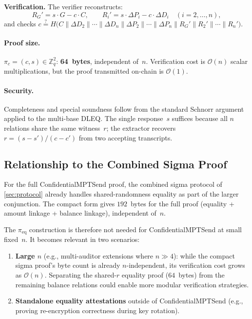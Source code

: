 \documentclass[11pt]{article}
\theoremstyle{definition}
\newcommand{\Zq}{\mathbb{Z}_q}
\begin{document}
\noindent\textbf{Verification.}
The verifier reconstructs:
\[
  R_G' = s \cdot G - c \cdot C, \qquad
  R_i' = s \cdot \Delta P_i - c \cdot \Delta D_i
  \quad (i = 2, \ldots, n),
\]
and checks $c \stackrel{?}{=}
H\bigl(C
\| \Delta D_2 \| \cdots \| \Delta D_n
\| \Delta P_2 \| \cdots \| \Delta P_n
\| R_G' \| R_2' \| \cdots \| R_n'\bigr)$.

\paragraph{Proof size.}
$\pi_c = (c, s) \in \Zq^2$: \textbf{64~bytes}, independent of~$n$.
Verification cost is $\mathcal{O}(n)$ scalar multiplications, but the
proof transmitted on-chain is $\mathcal{O}(1)$.

\paragraph{Security.}
Completeness and special soundness follow from the standard Schnorr
argument applied to the multi-base DLEQ.
The single response~$s$ suffices because all $n$ relations share the
same witness~$r$; the extractor recovers
$r = (s - s') / (c - c')$ from two accepting transcripts.

\subsection{Relationship to the Combined Sigma Proof}

For the full \textsf{ConfidentialMPTSend} proof, the combined sigma
protocol of \cref{sec:protocol} already handles shared-randomness
equality as part of the larger conjunction.
The compact form gives $192$~bytes for the full proof (equality +
amount linkage + balance linkage), independent of~$n$.

The $\pi_{\mathrm{eq}}$ construction is therefore not needed for
\textsf{ConfidentialMPTSend} at small fixed~$n$.
It becomes relevant in two scenarios:
\begin{enumerate}[nosep]
  \item \textbf{Large $n$} (e.g., multi-auditor extensions where
        $n \gg 4$): while the compact sigma proof's byte count is
        already $n$-independent, its verification cost grows as
        $\mathcal{O}(n)$.
        Separating the shared-$r$ equality proof ($64$~bytes) from
        the remaining balance relations could enable more modular
        verification strategies.
  \item \textbf{Standalone equality attestations} outside of
        \textsf{ConfidentialMPTSend} (e.g., proving re-encryption
        correctness during key rotation).
\end{enumerate}
\end{document}

